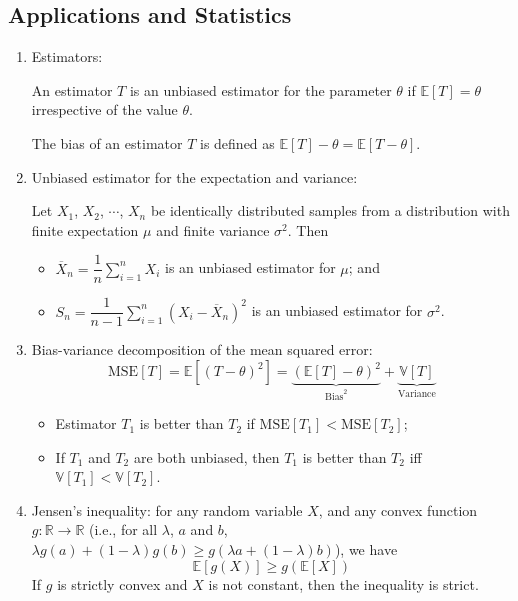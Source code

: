 \documentclass{article}
\begin{document}
\subsection{Applications and Statistics}

\begin{enumerate}
	\item Estimators:
	
%		
		
		An estimator $T$ is an unbiased estimator for the parameter $\theta$ if $\mathbb{E}[T]=\theta$ irrespective of the value $\theta$.
		
		The bias of an estimator $T$ is defined as $\mathbb{E}[T]-\theta=\mathbb{E}[T-\theta]$.
		
	\item Unbiased estimator for the expectation and variance:
		
		Let $X_1$, $X_2$, $\cdots$, $X_n$ be identically distributed samples from a distribution with finite expectation $\mu$ and finite variance $\sigma^2$. Then
		\begin{itemize}
			\item $\overline{X}_n=\dfrac{1}{n}\displaystyle\sum_{i=1}^{n}X_i$ is an unbiased estimator for $\mu$; and
			\item $S_n=\dfrac{1}{n-1}\displaystyle\sum_{i=1}^{n}\left(X_i-\overline{X}_n\right)^2$ is an unbiased estimator for $\sigma^2$.
		\end{itemize} 
		
	\item Bias-variance decomposition of the mean squared error:
		$$\mathrm{MSE}[T]=\mathbb{E}[(T-\theta)^2]=\underbrace{(\mathbb{E}[T]-\theta)^2}_{\text{Bias}^2}+\underbrace{\mathbb{V}[T]}_{\text{Variance}}$$
		\begin{itemize}
			\item Estimator $T_1$ is better than $T_2$ if $\mathrm{MSE}[T_1]<\mathrm{MSE}[T_2]$;
			\item If $T_1$ and $T_2$ are both unbiased, then $T_1$ is better than $T_2$ iff $\mathbb{V}[T_1]<\mathbb{V}[T_2]$.
		\end{itemize} 
		
	\item Jensen's inequality: for any random variable $X$, and any convex function $g:\mathbb{R}\to\mathbb{R}$ (i.e., for all $\lambda$, $a$ and $b$, $\lambda g(a)+(1-\lambda)g(b)\geq g(\lambda a+(1-\lambda)b)$), we have 
		$$\mathbb{E}[g(X)]\geq g(\mathbb{E}[X])$$
		If $g$ is strictly convex and $X$ is not constant, then the inequality is strict.
		

\end{enumerate}
\end{document}
